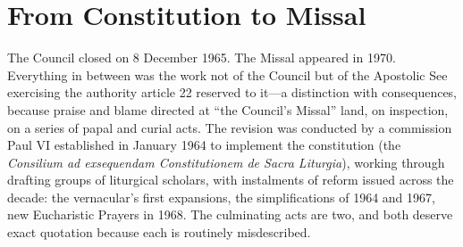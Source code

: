 \section{From Constitution to Missal}

The Council closed on 8 December 1965. The Missal appeared in 1970. Everything in between was the work not of the Council but of the Apostolic See exercising the authority article 22 reserved to it---a distinction with consequences, because praise and blame directed at ``the Council's Missal'' land, on inspection, on a series of papal and curial acts. The revision was conducted by a commission Paul VI established in January 1964 to implement the constitution (the \emph{Consilium ad exsequendam Constitutionem de Sacra Liturgia}), working through drafting groups of liturgical scholars, with instalments of reform issued across the decade: the vernacular's first expansions, the simplifications of 1964 and 1967, new Eucharistic Prayers in 1968. The culminating acts are two, and both deserve exact quotation because each is routinely misdescribed.

